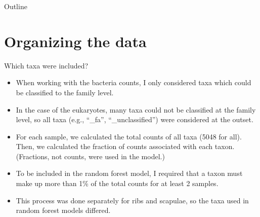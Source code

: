 \documentclass{beamer}
\date{Feb.\ 2020}
\begin{document}

\begin{frame}{Outline}
  \tableofcontents
\end{frame}








\section{Organizing the data}


\begin{frame}{Which taxa were included?}

  {\footnotesize
    \begin{itemize}
    \item When working with the bacteria counts, I only considered
      taxa which could be classified to the family level.
    \item In the case of the eukaryotes, many taxa could not be
      classified at the family level, so all taxa (e.g., ``\_fa'',
      ``\_unclassified'') were considered at the outset.
    \item For each sample, we calculated the total counts of all taxa
      (5048 for all).  Then, we calculated the fraction of counts
      associated with each taxon.  (Fractions, not counts, were used
      in the model.)
    \item To be included in the random forest model, I required that
      a taxon must make up more than 1\% of the total counts for at least
      2 samples.
     \item This process was done separately for ribs and scapulae, so
       the taxa used in random forest models differed.
    \end{itemize}
  }
  
\end{frame}
\end{document}
